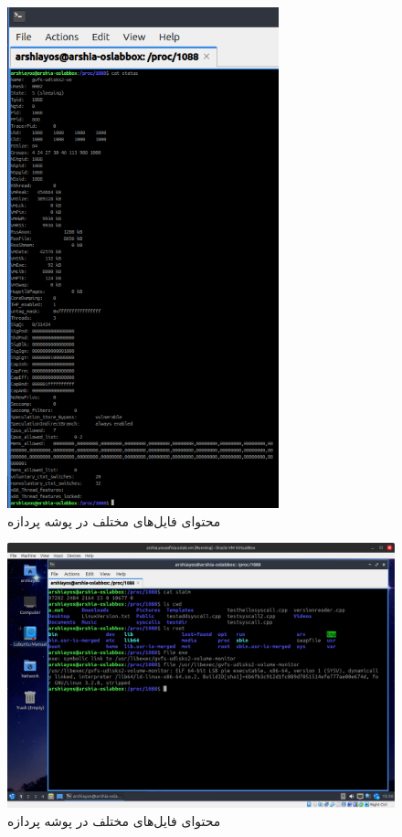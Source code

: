 \documentclass[12pt]{article}
\begin{document}
	\begin{figure}[H]
		\centering
		\includegraphics[width=0.7\textwidth]{report3-resources/12.png}
		\caption{محتوای فایل‌های مختلف در پوشه پردازه}
		\label{fig:11}
	\end{figure}
	\begin{figure}[H]
		\centering
		\includegraphics[width=\textwidth]{report3-resources/13.png}
		\caption{محتوای فایل‌های مختلف در پوشه پردازه}
		\label{fig:12}
	\end{figure}
\end{document}
